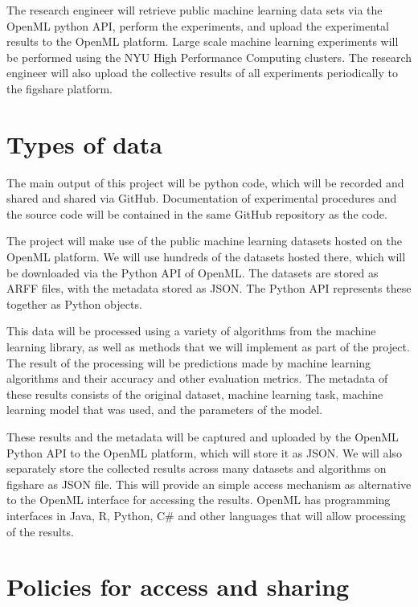 The research engineer will retrieve public machine learning data sets via the
OpenML python API, perform the experiments, and upload the experimental results
to the OpenML platform. Large scale machine learning experiments will be
performed using the NYU High
Performance Computing clusters. The research engineer will also upload the
collective results of all experiments periodically to the figshare platform.

\section{Types of data}

The main output of this project will be python code, which will be recorded and
shared and shared via GitHub. Documentation of experimental procedures and the
source code will be contained in the same GitHub repository as the code.

The project will make use of the public machine learning datasets hosted on the
OpenML platform. We will use hundreds of the datasets hosted there, which will
be downloaded via the Python API of OpenML\@. The datasets are stored as ARFF
files, with the metadata stored as JSON\@. The Python API represents these
together as Python objects.

This data will be processed using a variety of algorithms from the \sklearn{}
machine learning library, as well as methods that we will implement as part of
the project. The result of the processing will be predictions made by machine
learning algorithms and their accuracy and other evaluation metrics. The
metadata of these results consists of the original dataset, machine learning
task, machine learning model that was used, and the parameters of the model.

These results and the metadata will be captured and uploaded by the OpenML
Python API to the OpenML platform, which will store it as JSON\@. We will also
separately store the collected results across many datasets and algorithms on
figshare as JSON file. This will provide an  simple access mechanism as
alternative to the OpenML interface for accessing the results. OpenML has
programming interfaces in Java, R, Python, C\# and other languages that will
allow processing of the results.


\section{Policies for access and sharing}

